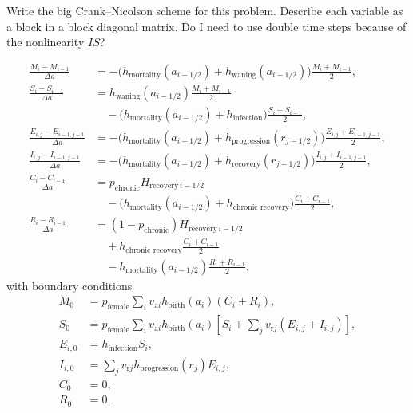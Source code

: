 \documentclass[12pt]{article}
\begin{document}
Write the big Crank--Nicolson scheme for this problem.  Describe each
variable as a block in a block diagonal matrix.  Do I need to
use double time steps because of the nonlinearity $I S$?

\begin{equation}
  \begin{split}
    \frac{M_i - M_{i - 1}}{\Delta a}
    &= - \big(h_{\text{mortality}}(a_{i - 1/2})
    + h_{\text{waning}}(a_{i - 1 / 2})\big)
    \frac{M_i + M_{i - 1}}{2},
    \\
    \frac{S_i - S_{i - 1}}{\Delta a}
    &= h_{\text{waning}}(a_{i - 1 / 2})
    \frac{M_i + M_{i - 1}}{2}
    \\ & \quad {}
    - \big(h_{\text{mortality}}(a_{i - 1 / 2})
    + h_{\text{infection}}\big)
    \frac{S_i + S_{i - 1}}{2},
    \\
    \frac{E_{i, j} - E_{i - 1, j - 1}}{\Delta a}
    &=- \big(h_{\text{mortality}}(a_{i - 1 / 2})
    + h_{\text{progression}}(r_{j - 1 / 2})\big)
    \frac{E_{i, j} + E_{i - 1, j - 1}}{2},
    \\
    \frac{I_{i, j} - I_{i - 1, j - 1}}{\Delta a}
    &= - \big(h_{\text{mortality}}(a_{i - 1 / 2})
    + h_{\text{recovery}}(r_{j - 1 / 2})\big)
    \frac{I_{i, j} + I_{i - 1, j - 1}}{2},
    \\
    \frac{C_i - C_{i - 1}}{\Delta a}
    &= p_{\text{chronic}} H_{\text{recovery} \, i - 1 / 2}
    \\ & \quad {}
    - \big(h_{\text{mortality}}(a_{i - 1 / 2})
    + h_{\text{chronic recovery}}\big) \frac{C_i + C_{i - 1}}{2},
    \\
    \frac{R_i - R_{i - 1}}{\Delta a}
    &= (1 - p_{\text{chronic}}) H_{\text{recovery} \, i - 1 / 2}
    \\ & \quad {}
    + h_{\text{chronic recovery}} \frac{C_i + C_{i - 1}}{2}
    \\ & \quad {}
    - h_{\text{mortality}}(a_{i - 1 / 2}) \frac{R_i + R_{i - 1}}{2},
  \end{split}
\end{equation}
with boundary conditions
\begin{equation}
  \begin{split}
    M_0
    &= p_{\text{female}}
    \sum_i v_{\text{a} i} h_{\text{birth}}(a_i) \left(C_i + R_i\right),
    \\
    S_0
    &= p_{\text{female}}
    \sum_i v_{\text{a} i} h_{\text{birth}}(a_i) \left[S_i +
    \sum_j v_{\text{r} j} \left(E_{i, j} + I_{i, j}\right)\right],
    \\
    E_{i, 0} &= h_{\text{infection}} S_i,
    \\
    I_{i, 0} &= \sum_j v_{\text{r} j} h_{\text{progression}}(r_j) E_{i, j},
    \\
    C_0 &= 0,
    \\
    R_0 &= 0,
  \end{split}
\end{equation}
\end{document}
